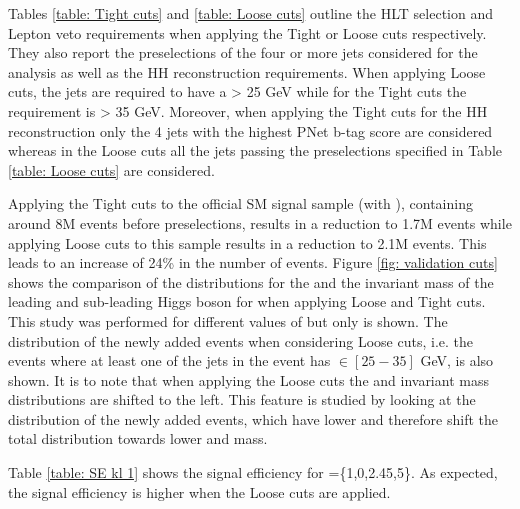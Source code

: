 Tables \ref{table: Tight cuts} and \ref{table: Loose cuts} outline the HLT selection and Lepton veto requirements when applying the Tight or Loose cuts respectively. They also report the preselections of the four or more jets considered for the analysis as well as the HH reconstruction requirements.  When applying Loose cuts, the jets are required to have a \pt > 25 GeV while for the Tight cuts the requirement is \pt > 35 GeV. Moreover, when applying the Tight cuts for the HH reconstruction only the 4 jets with the highest PNet b-tag score are considered whereas in the Loose cuts all the jets passing the preselections specified in Table \ref{table: Loose cuts} are considered. 

Applying the Tight cuts to the official SM signal sample (with ), containing around 8M events before preselections, results in a reduction to 1.7M events while applying Loose cuts to this sample results in a reduction to 2.1M events. This leads to an increase of 24\% in the number of events. Figure \ref{fig: validation cuts} shows the comparison of the distributions for the \pt and the invariant mass of the leading and sub-leading Higgs boson for  when applying Loose and Tight cuts. This study was performed for different values of \kl but only  is shown. The distribution of the newly added events when considering Loose cuts, i.e. the events where at least one of the jets in the event has \pt $\in [25-35]$ GeV, is also shown. It is to note that when applying the Loose cuts the \pt and invariant mass distributions are shifted to the left. This feature is studied by looking at the distribution of the newly added events, which have lower \pt and therefore shift the total distribution towards lower \pt and mass.

Table \ref{table: SE kl 1} shows the signal efficiency for \kl=\{1,0,2.45,5\}. As expected, the signal efficiency is higher when the Loose cuts are applied.

